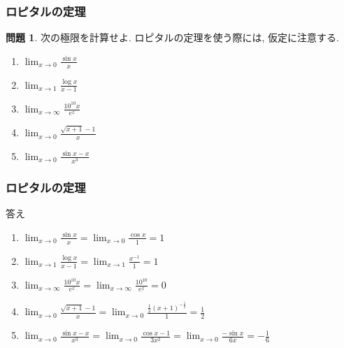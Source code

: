 \documentclass[dvipdfmx,cjk,10.2pt]{beamer}
\theoremstyle{definition}
\newtheorem{Prob}[Thm]{問題}
\begin{document}


\begin{frame}
\frametitle{ロピタルの定理}


\begin{Prob}
次の極限を計算せよ. ロピタルの定理を使う際には, 仮定に注意する.  \vspace{2mm}
\begin{enumerate}
\item $\displaystyle \lim_{x\to 0} \frac{\sin x}{x}$ \vspace{2mm}
\item  $\displaystyle \lim_{x\to 1} \frac{\log x}{x-1}$ \vspace{2mm}
\item $\displaystyle \lim_{x\to \infty} \frac{10^{10}x}{e^x}$ \vspace{2mm}
\item $\displaystyle \lim_{x\to 0} \frac{\sqrt{x+1}-1}{x}$ \vspace{2mm}
\item $\displaystyle \lim_{x\to 0} \frac{\sin x-x}{x^3}$ 
\end{enumerate}
\end{Prob}

\end{frame}



\begin{frame}
\frametitle{ロピタルの定理}

答え

\begin{enumerate}
\item $\displaystyle \lim_{x\to 0} \frac{\sin x}{x}= \lim_{x\to 0} \frac{\cos x}{1}=1$ \vspace{3mm}
\item  $\displaystyle \lim_{x\to 1} \frac{\log x}{x-1}= \lim_{x\to 1} \frac{x^{-1}}{1}=1$ \vspace{3mm}
\item $\displaystyle \lim_{x\to \infty} \frac{10^{10}x}{e^x}= \lim_{x\to \infty} \frac{10^{10}}{e^x}=0$ \vspace{3mm}
\item $\displaystyle \lim_{x\to 0} \frac{\sqrt{x+1}-1}{x}= \lim_{x\to 0} \frac{\frac{1}{2}(x+1)^{-\frac{1}{2}}}{1}=\frac{1}{2}$ \vspace{3mm}
\item $\displaystyle \lim_{x\to 0} \frac{\sin x-x}{x^3}= \lim_{x\to 0} \frac{\cos x-1}{3x^2}= \lim_{x\to 0} \frac{-\sin x}{6x}=-\frac{1}{6}$ 
\end{enumerate}


\end{frame}
\end{document}
